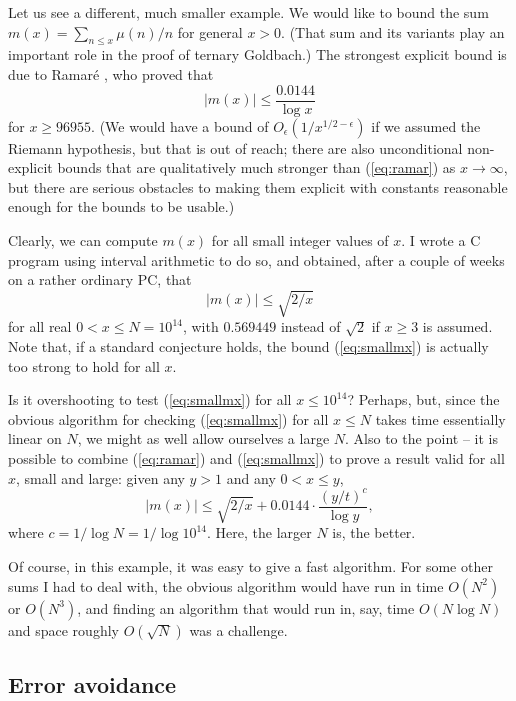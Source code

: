   Let us see a different, much smaller example. We would like to bound
  the sum $m(x) =\sum_{n\leq x} \mu(n)/n$ for general $x>0$. (That sum and its
  variants play an important role in the proof of ternary Goldbach.)
  The strongest
  explicit bound is due to Ramar\'e \cite{ramare2015explicit}, who proved that
  \begin{equation}\label{eq:ramar}
    |m(x)|\leq \frac{0.0144}{\log x}\end{equation}
  for $x\geq 96955$. (We would have a bound of $O_\epsilon(1/x^{1/2-\epsilon})$ if
  we assumed the Riemann hypothesis, but that is out of reach; there
  are also unconditional non-explicit bounds that are qualitatively
  much stronger than (\ref{eq:ramar}) as $x\to \infty$, but there are
  serious obstacles to making them explicit with constants reasonable enough
  for the bounds to be usable.)

  Clearly, we can compute $m(x)$ for all small integer values of $x$.
  I wrote a C program using interval arithmetic to do so, and obtained, after
  a couple of weeks on a rather ordinary PC, that
  \begin{equation}\label{eq:smallmx}
    |m(x)|\leq \sqrt{2/x}
  \end{equation}
  for all real $0<x\leq N = 10^{14}$, with $0.569449$ instead of $\sqrt{2}$ if
  $x\geq 3$ is assumed. Note that, if a standard conjecture holds, the bound
  (\ref{eq:smallmx}) is actually too strong to hold for all $x$.

  Is it overshooting to test (\ref{eq:smallmx}) for all $x\leq 10^{14}$? Perhaps, but, since the
  obvious algorithm for checking (\ref{eq:smallmx}) for all $x\leq N$ takes
  time essentially linear on $N$, we might as well allow ourselves a large $N$.
  Also to the point -- it is possible to combine (\ref{eq:ramar}) and
  (\ref{eq:smallmx}) to prove a result valid for all $x$, small and large:
  given any $y>1$ and any $0<x\leq y$,
  \[|m(x)|\leq \sqrt{2/x} + 0.0144\cdot \frac{(y/t)^c}{\log y},\]
  where $c=1/\log N= 1/\log 10^{14}$. Here, the larger $N$ is, the better.
  
  Of course, in this example, it was easy to give a fast algorithm. For
  some other sums I had to deal with, the obvious algorithm would have run in
  time $O(N^2)$ or $O(N^3)$, and finding an algorithm that would run in,
  say, time $O(N \log N)$ and space roughly $O(\sqrt{N})$ was a challenge.
  
  
\subsection{Error avoidance}

